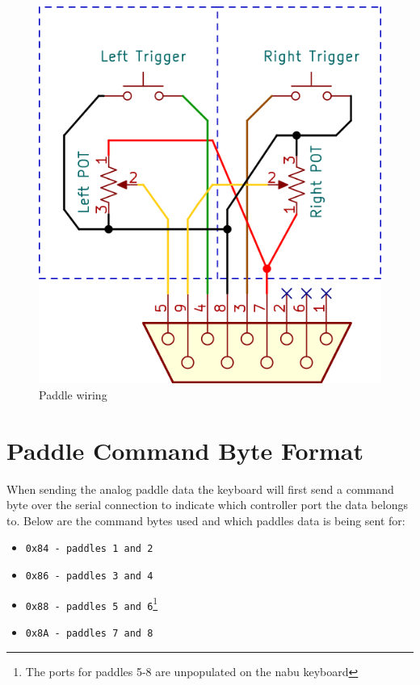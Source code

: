 \documentclass[a4paper,12pt]{article}
\begin{document}
\pagebreak

\begin{figure}[h]
     \includegraphics[width=\linewidth]{graphicx/paddles.png}
     \caption{Paddle wiring}
     \label{fig1:paddles}
\end{figure}

\pagebreak

\section*{Paddle Command Byte Format}
When sending the analog paddle data the keyboard will first send a command byte
over the serial connection to indicate which controller port the data belongs
to. Below are the command bytes used and which paddles data is being sent for:

\begin{itemize}
    \setlength\itemsep{-0.25em}
    \item \texttt{0x84 - paddles 1 and 2}
    \item \texttt{0x86 - paddles 3 and 4}
    \item \texttt{0x88 - paddles 5 and 6}\footnote{The ports for paddles 5-8 are unpopulated on the nabu keyboard}
    \item \texttt{0x8A - paddles 7 and 8}\footnotemark[\value{footnote}]
\end{itemize}
\end{document}
